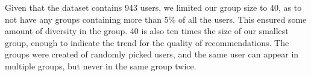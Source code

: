 Given that the dataset contains 943 users, we limited our group size to 40, as to not have any groups containing more than 5\% of all the users. This ensured some amount of diversity in the group. 40 is also ten times the size of our smallest group, enough to indicate the trend for the quality of recommendations. The groups were created of randomly picked users, and the same user can appear in multiple groups, but never in the same group twice.